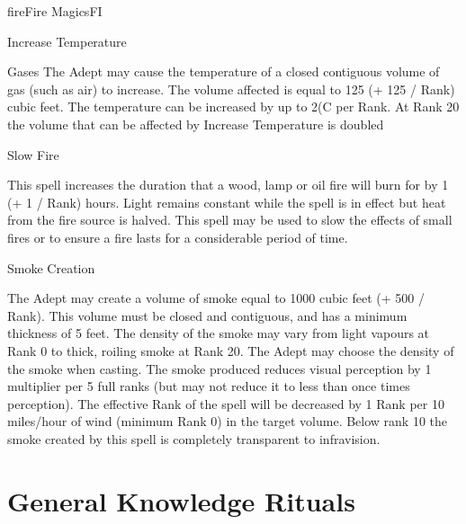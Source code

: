 \begin{College}[2.0]{fire}{Fire Magics}{FI}
\begin{spell}[G-6]{Increase Temperature}
\begin{effects}
Gases 
The Adept may cause the temperature of a closed contiguous volume of
gas (such as air) to increase.  The volume affected is equal to 125 (+
125 / Rank) cubic feet. The temperature can be increased by up to 2(C
per Rank.  At Rank 20 the volume that can be affected by Increase
Temperature is doubled

\end{effects}
\end{spell}


\begin{spell}[G-7]{Slow Fire}
\begin{effects}
This spell increases the duration that a wood, lamp or oil fire will
burn for by 1 (+ 1 / Rank) hours. Light remains constant while the
spell is in effect but heat from the fire source is halved.  This
spell may be used to slow the effects of small fires or to ensure a
fire lasts for a considerable period of time.
\end{effects}
\end{spell}


\begin{spell}[G-8]{Smoke Creation}
\begin{effects}
The Adept may create a volume of smoke equal to 1000 cubic feet (+ 500
/ Rank). This volume must be closed and contiguous, and has a minimum
thickness of 5 feet.  The density of the smoke may vary from light
vapours at Rank 0 to thick, roiling smoke at Rank 20.  The Adept may
choose the density of the smoke when casting. The smoke produced
reduces visual perception by 1 multiplier per 5 full ranks (but may
not reduce it to less than once times perception).  The effective Rank
of the spell will be decreased by 1 Rank per 10 miles/hour of wind
(minimum Rank 0) in the target volume. Below rank 10 the smoke created
by this spell is completely transparent to infravision.
\end{effects}
\end{spell}


\section{General Knowledge Rituals}


\end{College}
